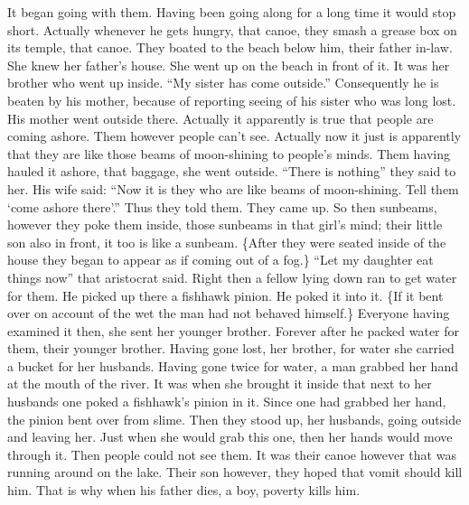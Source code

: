 \begin{pairs}
\begin{Rightside}
It began going with them.
Having been going along for a long time it would stop short.
Actually whenever he gets hungry, that canoe, they smash a grease box on its temple, that canoe.
\pend
\pstart
{}They boated to the beach below him, their father in-law.
She knew her father’s house.
She went up on the beach in front of it.
It was her brother who went up inside.
\qqk{}“My sister has come outside.”
Consequently he is beaten by his mother, because of reporting seeing of his sister who was long lost.
His mother went outside there.
Actually it apparently is true that people are coming ashore.
Them however people can’t see.
Actually now it just is apparently that they are like those beams of moon-shining to people’s minds.
Them having hauled it ashore, that baggage, she went outside.
“There is nothing” they said to her.
His wife said:
\qqk{}“Now it is they who are like beams of moon-shining.
Tell them ‘come ashore there’.”
Thus they told them.
They came up.
\pend
\pstart
{}So then sunbeams, however they poke them inside, those sunbeams in that girl’s mind;
their little son also in front, it too is like a sunbeam.
\{After they were seated inside of the house they began to appear as if coming out of a fog.\}
\qqk{}“Let my daughter eat things now” that aristocrat said.
Right then a fellow lying down ran to get water for them.
He picked up there a fishhawk pinion.
He poked it into it.
\{If it bent over on account of the wet the man had not behaved himself.\}
Everyone having examined it then, she sent her younger brother.
Forever after he packed water for them, their younger brother.
Having gone lost, her brother, for water she carried a bucket for her husbands.
Having gone twice for water, a man grabbed her hand at the mouth of the river.
It was when she brought it inside that next to her husbands one poked a fishhawk’s pinion in it.
Since one had grabbed her hand, the pinion bent over from slime.
Then they stood up, her husbands, going outside and leaving her.
Just when she would grab this one, then her hands would move through it.
Then people could not see them.
It was their canoe however that was running around on the lake.
\pend
\pstart
{}Their son however, they hoped that vomit should kill him.
That is why when his father dies, a boy, poverty kills him.

\end{Rightside}
\end{pairs}
